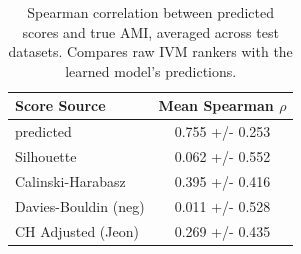 \begin{table}[t]
\centering
\caption{Spearman correlation between predicted scores and true AMI, averaged across test datasets. Compares raw IVM rankers with the learned model's predictions.}
\label{tab:correlation}
\begin{tabular}{lc}
\toprule
Score Source & Mean Spearman $\rho$ \\
\midrule
predicted & 0.755 +/- 0.253 \\
Silhouette & 0.062 +/- 0.552 \\
Calinski-Harabasz & 0.395 +/- 0.416 \\
Davies-Bouldin (neg) & 0.011 +/- 0.528 \\
CH Adjusted (Jeon) & 0.269 +/- 0.435 \\
\bottomrule
\end{tabular}
\end{table}